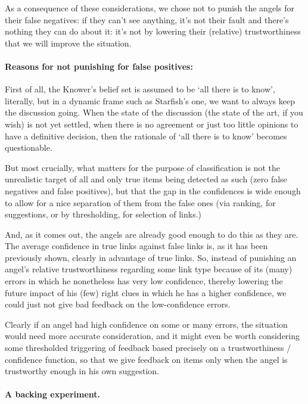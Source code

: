 \documentclass[11pt]{article}
\begin{document}
As a consequence of these considerations, we chose not to punish the angels for their false negatives: if they can't see anything, it's not their fault and there's nothing they can do about it: it's not by lowering their (relative) trustworthiness that we will improve the situation.

\paragraph{Reasons for not punishing for false positives:}

First of all, the Knower's belief set is assumed to be `all there is to know', literally, but in a dynamic frame such as Starfish's one, we want to always keep the discussion going. When the state of the discussion (the state of the art, if you wish) is not yet settled, when there is no agreement or just too little opinions to have a definitive decision, then the rationale of `all there is to know' becomes questionable.

But most crucially, what matters for the purpose of classification is not the unrealistic target of all and only true items being detected as such (zero false negatives and false positives), but that the gap in the confidences is wide enough to allow for a nice separation of them from the false ones (via ranking, for suggestions, or by thresholding, for selection of links.)

And, as it comes out, the angels are already good enough to do this as they are. The average confidence in true links against false links is, as it has been previously shown, clearly in advantage of true links. So, instead of punishing an angel's relative trustworthiness regarding some link type because of its (many) errors in which he nonetheless has very low confidence, thereby lowering the future impact of his (few) right clues in which he has a higher confidence, we could just not give bad feedback on the low-confidence errors.

Clearly if an angel had high confidence on some or many errors, the situation would need more accurate consideration, and it might even be worth considering some thresholded triggering of feedback based precisely on a trustworthiness / confidence function, so that we give feedback on items only when the angel is trustworthy enough in his own suggestion.


\paragraph{A backing experiment.}
\end{document}
